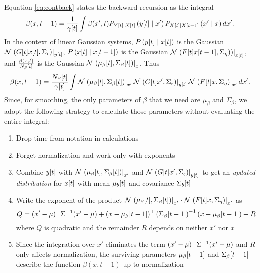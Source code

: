 Equation \eqref{eq:contback} states the backward recursion as the
integral
\begin{equation*}
  \beta(x,t-1) =  
  \frac{1}{{\gamma}{[t]}} \int\beta(x',t)
  P_{{Y}{[t]}\mid {X}{[t]}}\left({y}{[t]}\mid x' \right)
  P_{{X}{[t]}\mid {X}{[t-1]}}\left(x'\mid x \right) dx'.
\end{equation*}
In the context of linear Gaussian systems, $P
\left({y}{[t]}\mid {x}{[t]} \right)$ is the Gaussian
${\mathcal{N}}\left.\left({G}{[t]}{x}{[t]},\Sigma_\epsilon\right)\right|_{{y}{[t]}}$, $P
\left({x}{[t]}\mid {x}{[t-1]}\right) $ is the Gaussian $
{\mathcal{N}}\left.\left({F}{[t]} {x}{[t-1]},\Sigma_\eta)\right)\right|_{{x}{[t]}}$, and
$\frac{\beta(x,t)}{{N_\beta}{[t]}} $ is the Gaussian $
{\mathcal{N}}\left.\left({\mu_\beta}{[t]},{\Sigma_\beta}{[t]}\right)\right|_{x}$.  Thus
\begin{equation*}
  \beta(x,t-1) =  
  \frac{{N_\beta}{[t]}}{{\gamma}{[t]}} \int
  {\mathcal{N}}\left.\left({\mu_\beta}{[t]},{\Sigma_\beta}{[t]}\right)\right|_{x'}
  {\mathcal{N}}\left.\left({G}{[t]}x',\Sigma_\epsilon\right)\right|_{{y}{[t]}}
  {\mathcal{N}}\left.\left({F}{[t]}x,\Sigma_\eta\right)\right|_{x'}   dx'.
\end{equation*}
Since, for smoothing, the only parameters of $\beta$ that we need are
$\mu_\beta$ and $\Sigma_\beta$, we adopt the following strategy to
calculate those parameters without evaluating the entire integral:
\begin{enumerate}
\item \label{BackList1} Drop time from notation in calculations
\item \label{BackList2} Forget normalization and work only with exponents
\item \label{BackList3} Combine ${y}{[t]}$ with
  ${\mathcal{N}}\left.\left({\mu_\beta}{[t]},{\Sigma_\beta}{[t]}\right)\right|_{x'}$ and
  ${\mathcal{N}}\left.\left({G}{[t]}x',\Sigma_\epsilon\right)\right|_{{y}{[t]}}$ to get an
  \emph{updated distribution} for ${x}{[t]}$ with mean
  ${\mu_b}{[t]}$ and covariance ${\Sigma_b}{[t]}$
\item \label{BackList4} Write the exponent of the product
  ${\mathcal{N}}\left.\left({\mu_\beta}{[t]},{\Sigma_\beta}{[t]}\right)\right|_{x'} \cdot
  {\mathcal{N}}\left.\left({F}{[t]}x,\Sigma_\eta\right)\right|_{x'}$ as
  \begin{equation*}
    Q = (x' - \mu)^\top \Sigma^{-1} (x' - \mu) +
    (x - {\mu_\beta}{[t-1]})^\top \left({\Sigma_\beta}{[t-1]}
    \right)^{-1}(x - {\mu_\beta}{[t-1]}) + R
  \end{equation*}
  where $Q$ is quadratic and the remainder $R$ depends on neither $x'$
  nor $x$
\item \label{BackList5} Since the integration over $x'$ eliminates the
  term $(x' - \mu)^\top \Sigma^{-1} (x' - \mu)$ and $R$ only
  affects normalization, the surviving parameters
  ${\mu_\beta}{[t-1]}$ and ${\Sigma_\beta}{[t-1]}$ describe the
  function $\beta(x,t-1)$ up to normalization
\end{enumerate}

